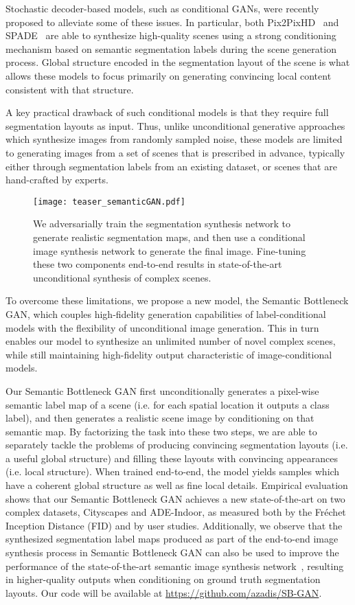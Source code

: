 \documentclass[10pt,twocolumn,letterpaper]{article}
\begin{document}
Stochastic decoder-based models, such as conditional GANs, were recently proposed to alleviate some of these issues. In particular, both Pix2PixHD~\cite{pix2pixHD} and SPADE~\cite{SPADE} are able to synthesize high-quality scenes using a strong conditioning mechanism based on semantic segmentation labels during the scene generation process. Global structure encoded in the segmentation layout of the scene is what allows these models to focus primarily on generating convincing local content consistent with that structure.

A key practical drawback of such conditional models is that they require full segmentation layouts as input. Thus, unlike unconditional generative approaches which synthesize images from randomly sampled noise, these models are limited to generating images from a set of scenes that is prescribed in advance, typically either through segmentation labels from an existing dataset, or scenes that are hand-crafted by experts.
\begin{figure}[t!]
\centering
\texttt{[image: teaser\_semanticGAN.pdf]}
\caption{We adversarially train the segmentation synthesis network to generate realistic segmentation maps, and then use a conditional image synthesis network to generate the final image. Fine-tuning these two components end-to-end results in state-of-the-art unconditional synthesis of complex scenes.}
\label{fig:teaser}
\end{figure}
To overcome these limitations, we propose a new model, the Semantic Bottleneck GAN, which couples high-fidelity generation capabilities of label-conditional models with the flexibility of unconditional image generation. This in turn enables our model to synthesize an unlimited number of novel complex scenes, while still maintaining high-fidelity output characteristic of image-conditional models.

Our Semantic Bottleneck GAN first unconditionally generates a pixel-wise semantic label map of a scene (i.e. for each spatial location it outputs a class label), and then generates a realistic scene image by conditioning on that semantic map. By factorizing the task into these two steps, we are able to separately tackle the problems of producing convincing segmentation layouts (i.e. a useful global structure) and filling these layouts with convincing appearances (i.e. local structure). When trained end-to-end, the model yields samples which have a coherent global structure as well as fine local details. Empirical evaluation shows that our Semantic Bottleneck GAN achieves a new state-of-the-art on two complex datasets, Cityscapes and ADE-Indoor, as measured both by the Fr\'echet Inception Distance (FID) and by user studies. Additionally, we observe that the synthesized segmentation label maps produced as part of the end-to-end image synthesis process in Semantic Bottleneck GAN can also be used to improve the performance of the state-of-the-art semantic image synthesis network~\cite{SPADE}, resulting in higher-quality outputs when conditioning on ground truth segmentation layouts. Our code will be available at \url{https://github.com/azadis/SB-GAN}.
\end{document}
